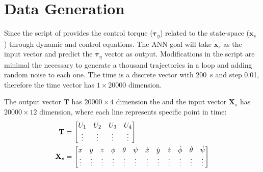 \section{Data Generation}

Since the script of \textcite{geronel2023} provides the control torque (\(\mathbf{\tau}_{\eta}\)) related to the state-space (\(\mathbf{x}_s\) ) through dynamic and control equations.
The ANN goal will take \(\mathbf{x}_s\) as the input vector and predict the \(\mathbf{\tau}_{\eta}\) vector as output.
Modifications in the script are minimal the necessary to generate a thousand trajectories in a loop and adding random noise to each one.
The time is a discrete vector with \SI{200}{s} and step 0.01, therefore the time vector has \(1\times 20000\) dimension.

The output vector \(\mathbf{T}\) has \(20000\times 4\) dimension the and the input vector \(\mathbf{X}_s\) has  \(20000\times 12\) dimension, where each line represents specific point in time:
%
\begin{align}
    \mathbf{T} &= \begin{bmatrix}
        U_1 & U_2 & U_3 & U_4 \\
        \vdots       & \vdots       & \vdots       & \vdots  \\
    \end{bmatrix} 
    \label{eq:tau_input} \\
    \setcounter{MaxMatrixCols}{13}
    \mathbf{X}_s &=
    \begin{bmatrix}
        x&y&z&\phi&\theta&\psi&\dot{x}&\dot{y}&\dot{z}&\dot{\phi}&\dot{\theta}&\dot{\psi} \\
        \vdots & \vdots & \vdots & \vdots & \vdots & \vdots & \vdots & \vdots & \vdots & \vdots & \vdots & \vdots 
    \end{bmatrix}
    \label{eq:xs_output}
\end{align}

